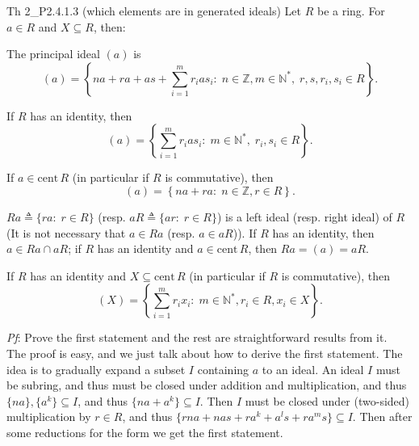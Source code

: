 \documentclass{article}
\newcommand{\cent}{\text{cent}\,} %
\begin{document}
\begin{Th}{Th 2\_P2.4.1.3 (which elements are in generated ideals)}
    Let $R$ be a ring. For $a\in R$ and $X\subseteq R$, then:
    \begin{compactenum}
        \item The principal ideal $(a)$ is
        $$ (a) = \left\{na+ra+as+\sum_{i=1}^{m}r_i a s_i:\; n\in \mathbb{Z}, m\in \mathbb{N}^\ast, \; r, s, r_i, s_i\in R \right\}. $$
        \item If $R$ has an identity, then
        $$ (a) = \left\{\sum_{i=1}^{m} r_i a s_i:\; m\in \mathbb{N}^\ast, \; r_i, s_i\in R \right\}. $$
        \item If $a\in\cent R$ (in particular if $R$ is commutative), then
        $$ (a) = \left\{na+ra:\; n\in \mathbb{Z}, r\in R \right\}. $$
        \item $Ra \triangleq \{ra:\; r\in R\}$ (resp. $aR \triangleq \{ar:\; r\in R\}$) is a left ideal (resp. right ideal) of $R$ (It is not necessary that $a\in Ra$ (resp. $a\in aR$)). If $R$ has an identity, then $a\in Ra\cap aR$; if $R$ has an identity and $a\in\cent R$, then $Ra = (a) = aR$. 
        \item If $R$ has an identity and $X\subseteq\cent R$ (in particular if $R$ is commutative), then
        $$ (X) = \left\{ \sum_{i=1}^{m} r_i x_i:\; m\in \mathbb{N}^\ast, r_i\in R, x_i\in X \right\}. $$
    \end{compactenum}
    \tcblower
    \textit{Pf}: Prove the first statement and the rest are straightforward results from it. \\
    The proof is easy, and we just talk about how to derive the first statement. The idea is to gradually expand a subset $I$ containing $a$ to an ideal. An ideal $I$ must be subring, and thus must be closed under addition and multiplication, and thus $\{na\}, \{a^k\}\subseteq I$, and thus
    $\{na+a^k\}\subseteq I$. Then $I$ must be closed under (two-sided) multiplication by $r\in R$, and thus $\{rna+nas+ra^k+a^ls+ra^ms\}\subseteq I$. Then after some reductions for the form we get the first statement.
\end{Th}
\end{document}
